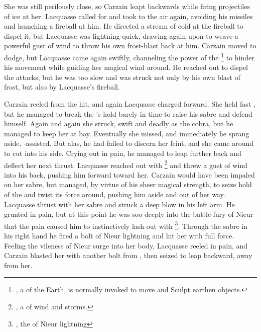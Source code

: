 She was still perilously close, so Carzain leapt backwards while firing projectiles of ice at her. Lacquasse called for \Feazin{} and took to the air again, avoiding his missiles and launching a fireball at him. He directed a stream of cold at the fireball to dispel it, but Lacquasse was lightning-quick, drawing again upon \Feazin{} to weave a powerful gust of wind to throw his own frost-blast back at him. Carzain moved to dodge, but Lacquasse came again swiftly, channeling the power of the \Sephirah{} \Curomon{}\footnote{\Curomon{}, a \Sephirah{} of the Earth, is normally invoked to move and Sculpt earthen objects.} to hinder his movement while guiding her magical wind around. He reached out to dispel the attacks, but he was too slow and was struck not only by his own blast of frost, but also by Lacquasse's fireball. 

Carzain reeled from the hit, and again Lacquasse charged forward. She held fast \Curomon{}, but he managed to break the \Sephirah{}'s hold barely in time to raise his sabre and defend himself. Again and again she struck, swift and deadly as the cobra, but he managed to keep her at bay. Eventually she missed, and immediately he sprang aside, \Feazin{}-assisted. But alas, he had failed to discern her feint, and she came around to cut into his side. Crying out in pain, he managed to leap further back and deflect her next thrust. Lacquasse reached out with \Brycorre{}\footnote{\Brycorre{}, a \Sephirah{} of wind and storms.} and threw a gust of wind into his back, pushing him forward toward her. Carzain would have been impaled on her sabre, but managed, by virtue of his sheer magical strength, to seize hold of the \Sephirah{} and twist its force around, pushing him aside and out of her way. Lacquasse thrust with her sabre and struck a deep blow in his left arm. He grunted in pain, but at this point he was soo deeply into the battle-fury of Nieur that the pain caused him to instinctively lash out with \Nyxachel{}\footnote{\Nyxachel{}, the \Kliffah{} of Nieur lightning}. Through the sabre in his right hand he fired a bolt of Nieur lightning and hit her with full force. Feeling the vileness of Nieur surge into her body, Lacquasse reeled in pain, and Carzain blasted her with another bolt from \Nyxachel{}, then seized \Feazin{} to leap backward, away from her. 

